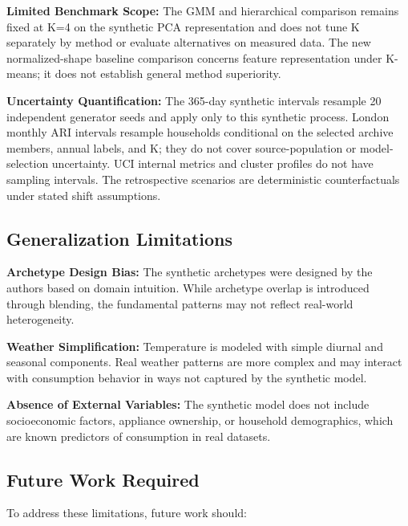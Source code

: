 \documentclass[11pt,a4paper]{article}
\begin{document}
\textbf{Limited Benchmark Scope:} The GMM and hierarchical comparison remains fixed at K=4 on the synthetic PCA representation and does not tune K separately by method or evaluate alternatives on measured data. The new normalized-shape baseline comparison concerns feature representation under K-means; it does not establish general method superiority.

\textbf{Uncertainty Quantification:} The 365-day synthetic intervals resample 20 independent generator seeds and apply only to this synthetic process. London monthly ARI intervals resample households conditional on the selected archive members, annual labels, and K; they do not cover source-population or model-selection uncertainty. UCI internal metrics and cluster profiles do not have sampling intervals. The retrospective scenarios are deterministic counterfactuals under stated shift assumptions.

\subsection{Generalization Limitations}

\textbf{Archetype Design Bias:} The synthetic archetypes were designed by the authors based on domain intuition. While archetype overlap is introduced through blending, the fundamental patterns may not reflect real-world heterogeneity.

\textbf{Weather Simplification:} Temperature is modeled with simple diurnal and seasonal components. Real weather patterns are more complex and may interact with consumption behavior in ways not captured by the synthetic model.

\textbf{Absence of External Variables:} The synthetic model does not include socioeconomic factors, appliance ownership, or household demographics, which are known predictors of consumption in real datasets.

\subsection{Future Work Required}

To address these limitations, future work should:
\end{document}
